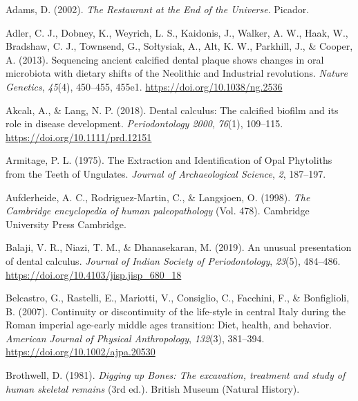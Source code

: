 \documentclass[
  b5paper,
]{book}
\newlength{\cslhangindent}
\newenvironment{CSLReferences}[2] %
 {\begin{list}{}{%
  \setlength{\itemindent}{0pt}
  \setlength{\leftmargin}{0pt}
  \setlength{\parsep}{0pt}
  \ifodd #1
   \setlength{\leftmargin}{\cslhangindent}
   \setlength{\itemindent}{-1\cslhangindent}
  \fi
  \setlength{\itemsep}{#2\baselineskip}}}
 {\end{list}}
\begin{document}
\label{refs-1}
\begin{CSLReferences}{1}{0}
Adams, D. (2002). \emph{The {Restaurant} at the {End} of the
{Universe}}. {Picador}.

Adler, C. J., Dobney, K., Weyrich, L. S., Kaidonis, J., Walker, A. W.,
Haak, W., Bradshaw, C. J., Townsend, G., Sołtysiak, A., Alt, K. W.,
Parkhill, J., \& Cooper, A. (2013). Sequencing ancient calcified dental
plaque shows changes in oral microbiota with dietary shifts of the
{Neolithic} and {Industrial} revolutions. \emph{Nature Genetics},
\emph{45}(4), 450--455, 455e1. \url{https://doi.org/10.1038/ng.2536}

Akcalı, A., \& Lang, N. P. (2018). Dental calculus: The calcified
biofilm and its role in disease development. \emph{Periodontology 2000},
\emph{76}(1), 109--115. \url{https://doi.org/10.1111/prd.12151}

Armitage, P. L. (1975). The {Extraction} and {Identification} of {Opal
Phytoliths} from the {Teeth} of {Ungulates}. \emph{Journal of
Archaeological Science}, \emph{2}, 187--197.

Aufderheide, A. C., Rodriguez-Martin, C., \& Langsjoen, O. (1998).
\emph{The {Cambridge} encyclopedia of human paleopathology} (Vol. 478).
{Cambridge University Press Cambridge}.

Balaji, V. R., Niazi, T. M., \& Dhanasekaran, M. (2019). An unusual
presentation of dental calculus. \emph{Journal of Indian Society of
Periodontology}, \emph{23}(5), 484--486.
\url{https://doi.org/10.4103/jisp.jisp_680_18}

Belcastro, G., Rastelli, E., Mariotti, V., Consiglio, C., Facchini, F.,
\& Bonfiglioli, B. (2007). Continuity or discontinuity of the life-style
in central {Italy} during the {Roman} imperial age-early middle ages
transition: {Diet}, health, and behavior. \emph{American Journal of
Physical Anthropology}, \emph{132}(3), 381--394.
\url{https://doi.org/10.1002/ajpa.20530}

Brothwell, D. (1981). \emph{Digging up {Bones}: {The} excavation,
treatment and study of human skeletal remains} (3rd ed.). {British
Museum (Natural History)}.


\end{CSLReferences}
\end{document}
